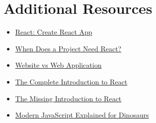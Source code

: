\section{Additional Resources}

\begin{itemize}[leftmargin=*]
    \item \href{https://reactjs.org/docs/add-react-to-a-new-app.html#create-react-app}{React: Create React App}
    \item \href{https://css-tricks.com/project-need-react/}{When Does a Project Need React?}
    \item \href{https://www.seguetech.com/website-vs-web-application-whats-the-difference/}{Website vs Web Application}
    \item \href{https://jscomplete.com/learn/complete-intro-react}{The Complete Introduction to React}
    \item \href{https://medium.com/javascript-scene/the-missing-introduction-to-react-62837cb2fd76}{The Missing Introduction to React}
    \item \href{https://medium.com/the-node-js-collection/modern-javascript-explained-for-dinosaurs-f695e9747b70}{Modern JavaScript Explained for Dinosaurs}
\end{itemize}
